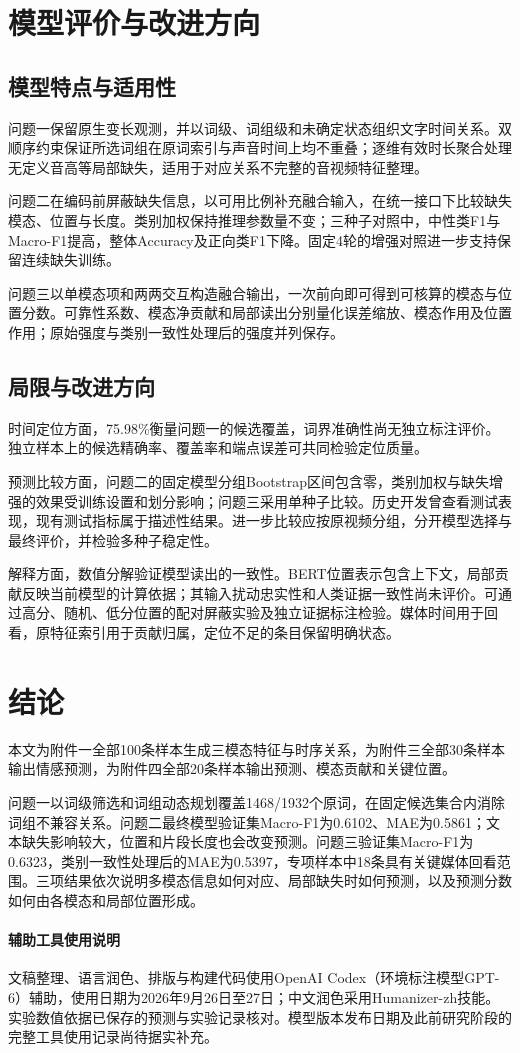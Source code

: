 \section{模型评价与改进方向}
\subsection{模型特点与适用性}
问题一保留原生变长观测，并以词级、词组级和未确定状态组织文字时间关系。双顺序约束保证所选词组在原词索引与声音时间上均不重叠；逐维有效时长聚合处理无定义音高等局部缺失，适用于对应关系不完整的音视频特征整理。

问题二在编码前屏蔽缺失信息，以可用比例补充融合输入，在统一接口下比较缺失模态、位置与长度。类别加权保持推理参数量不变；三种子对照中，中性类F1与Macro-F1提高，整体Accuracy及正向类F1下降。固定4轮的增强对照进一步支持保留连续缺失训练。

问题三以单模态项和两两交互构造融合输出，一次前向即可得到可核算的模态与位置分数。可靠性系数、模态净贡献和局部读出分别量化误差缩放、模态作用及位置作用；原始强度与类别一致性处理后的强度并列保存。

\subsection{局限与改进方向}
时间定位方面，75.98\%衡量问题一的候选覆盖，词界准确性尚无独立标注评价。独立样本上的候选精确率、覆盖率和端点误差可共同检验定位质量。

预测比较方面，问题二的固定模型分组Bootstrap区间包含零，类别加权与缺失增强的效果受训练设置和划分影响；问题三采用单种子比较。历史开发曾查看测试表现，现有测试指标属于描述性结果。进一步比较应按原视频分组，分开模型选择与最终评价，并检验多种子稳定性。

解释方面，数值分解验证模型读出的一致性。BERT位置表示包含上下文，局部贡献反映当前模型的计算依据；其输入扰动忠实性和人类证据一致性尚未评价。可通过高分、随机、低分位置的配对屏蔽实验及独立证据标注检验。媒体时间用于回看，原特征索引用于贡献归属，定位不足的条目保留明确状态。

\section{结论}
本文为附件一全部100条样本生成三模态特征与时序关系，为附件三全部30条样本输出情感预测，为附件四全部20条样本输出预测、模态贡献和关键位置。

问题一以词级筛选和词组动态规划覆盖1468/1932个原词，在固定候选集合内消除词组不兼容关系。问题二最终模型验证集Macro-F1为0.6102、MAE为0.5861；文本缺失影响较大，位置和片段长度也会改变预测。问题三验证集Macro-F1为0.6323，类别一致性处理后的MAE为0.5397，专项样本中18条具有关键媒体回看范围。三项结果依次说明多模态信息如何对应、局部缺失时如何预测，以及预测分数如何由各模态和局部位置形成。

\paragraph{辅助工具使用说明}
文稿整理、语言润色、排版与构建代码使用OpenAI Codex（环境标注模型GPT-6）辅助，使用日期为2026年9月26日至27日；中文润色采用Humanizer-zh技能。实验数值依据已保存的预测与实验记录核对。模型版本发布日期及此前研究阶段的完整工具使用记录尚待据实补充。
